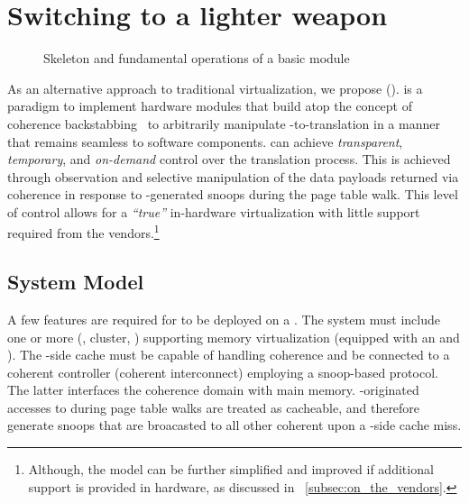 \section{Switching to a lighter weapon}
    \label{sec:model}

    \begin{figure*}
      \centering
      \resizebox{\linewidth}{!}{}
      \vspace{-1cm}
      \caption{Skeleton and fundamental operations of a basic \sname module}
      \label{fig:skeleton}
      \vspace{-0.2cm}
    \end{figure*}
    
    As an alternative approach to traditional virtualization, we propose \snamefull (\sname). \sname is a paradigm to implement hardware modules that build atop the concept of coherence backstabbing~\cite{CAESAR} to arbitrarily manipulate \va-to-\pa translation in a manner that remains seamless to software components.
    \sname can achieve \emph{transparent}, \emph{temporary}, and \emph{on-demand} control over the translation process. This is achieved through observation and selective manipulation of the data payloads returned via coherence in response to \mmu-generated snoops during the page table walk.
    This level of control allows for a \emph{``true''} in-hardware virtualization with little support required from the vendors.\footnote{Although, the model can be further simplified and improved if additional support is provided in hardware, as discussed in \sect~\ref{subsec:on_the_vendors}.}

    \subsection{System Model}
        \label{subsec:system_model}

        A few features are required for \sname to be deployed on a \soc.
        The system must include one or more  (\eg \cpu,  cluster, \gpu) supporting memory virtualization (\ie equipped with an \mmu and ).
        The \pe-side cache must be capable of handling coherence and be connected to a coherent controller (\eg coherent interconnect) employing a snoop-based protocol. The latter interfaces the coherence domain with main memory.
        \mmu-originated accesses to  during page table walks are treated as cacheable, and therefore generate snoops that are broacasted to all other coherent  upon a \pe-side cache miss.
  
